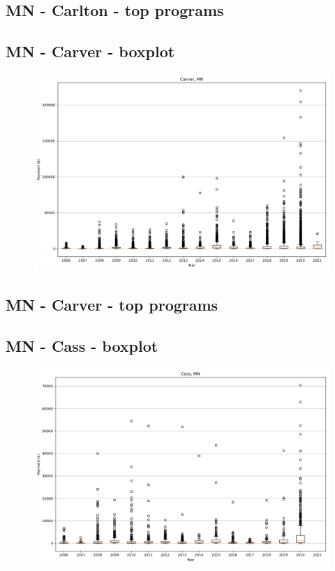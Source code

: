 \subsection*{MN - Carlton - top programs}

\newpage
\subsection*{MN - Carver - boxplot}
\begin{figure}[h]
\centering
\includegraphics[width=7in]{../output/boxplots/counties/Carver-MN_boxplot.png}
\end{figure}


\subsection*{MN - Carver - top programs}

\newpage
\subsection*{MN - Cass - boxplot}
\begin{figure}[h]
\centering
\includegraphics[width=7in]{../output/boxplots/counties/Cass-MN_boxplot.png}
\end{figure}


